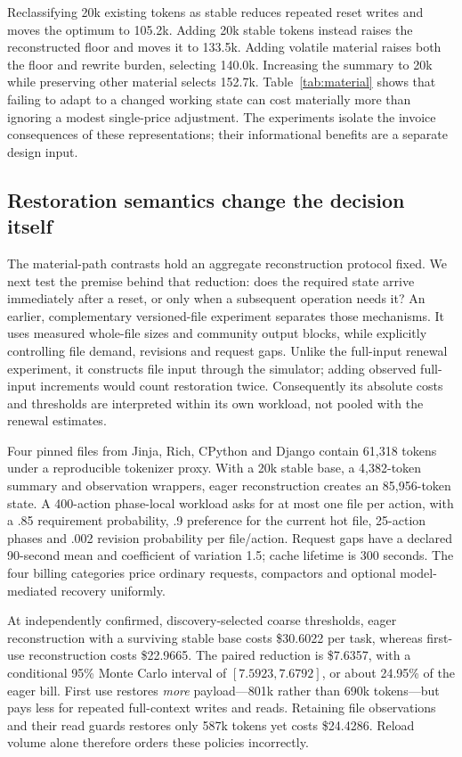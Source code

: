 \documentclass[sigconf,screen,nonacm]{acmart}
\begin{document}
Reclassifying 20k existing tokens as stable reduces repeated reset writes and
moves the optimum to 105.2k. Adding 20k stable tokens instead raises the
reconstructed floor and moves it to 133.5k. Adding volatile material raises
both the floor and rewrite burden, selecting 140.0k. Increasing the summary
to 20k while preserving other material selects 152.7k. Table~\ref{tab:material}
shows that failing to adapt to a changed working state can cost materially
more than ignoring a modest single-price adjustment. The experiments isolate
the invoice consequences of these representations; their informational
benefits are a separate design input.

\subsection{Restoration semantics change the decision itself}
\label{sec:restoration-evaluation}

The material-path contrasts hold an aggregate reconstruction protocol fixed.
We next test the premise behind that reduction: does the required state arrive
immediately after a reset, or only when a subsequent operation needs it?
An earlier, complementary versioned-file experiment separates those mechanisms.
It uses measured whole-file sizes and community output blocks, while explicitly
controlling file demand, revisions and request gaps. Unlike the full-input
renewal experiment, it constructs file input through the simulator; adding
observed full-input increments would count restoration twice. Consequently
its absolute costs and thresholds are interpreted within its own workload,
not pooled with the renewal estimates.

Four pinned files from Jinja, Rich, CPython and Django contain 61,318 tokens
under a reproducible tokenizer proxy. With a 20k stable base, a 4,382-token
summary and observation wrappers, eager reconstruction creates an 85,956-token
state. A 400-action phase-local workload asks for at most one file per action,
with a .85 requirement probability, .9 preference for the current hot file,
25-action phases and .002 revision probability per file/action. Request gaps
have a declared 90-second mean and coefficient of variation 1.5; cache lifetime
is 300 seconds. The four billing categories price ordinary requests, compactors
and optional model-mediated recovery uniformly.

At independently confirmed, discovery-selected coarse thresholds, eager
reconstruction with a surviving stable base costs \$30.6022 per task, whereas
first-use reconstruction costs \$22.9665. The paired reduction is
\$7.6357, with a conditional 95\% Monte Carlo interval of
$[7.5923,7.6792]$, or about 24.95\% of the eager bill. First use restores
\emph{more} payload---801k rather than 690k tokens---but pays less for
repeated full-context writes and reads. Retaining file observations and their
read guards restores only 587k tokens yet costs \$24.4286. Reload volume alone
therefore orders these policies incorrectly.
\end{document}
